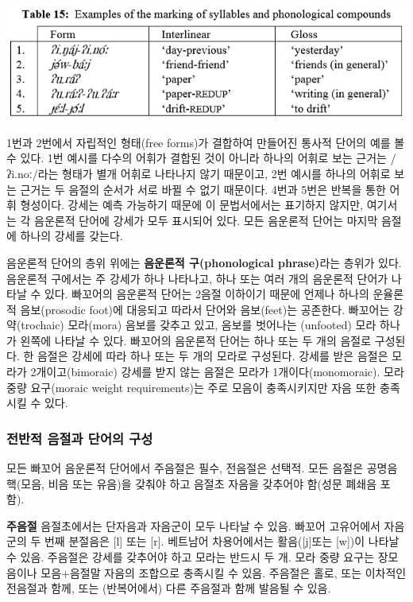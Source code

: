 \includegraphics{Pacoh/src/PacohTable15.png}

1번과 2번에서 자립적인 형태(free forms)가 결합하여 만들어진 통사적 단어의 예를 볼 수 있다.
1번 예시를 다수의 어휘가 결합된 것이 아니라 하나의 어휘로 보는 근거는 /ʔi.noː/라는 형태가 별개 어휘로 나타나지 않기 때문이고, 2번 예시를 하나의 어휘로 보는 근거는 두 음절의 순서가 서로 바뀔 수 없기 때문이다.
4번과 5번은 반복을 통한 어휘 형성이다. 강세는 예측 가능하기 때문에 이 문법서에서는 표기하지 않지만, 여기서는 각 음운론적 단어에 강세가 모두 표시되어 있다. 모든 음운론적 단어는 마지막 음절에 하나의 강세를 갖는다.

음운론적 단어의 층위 위에는 \textbf{음운론적 구(phonological phrase)}라는 층위가 있다. 음운론적 구에서는 주 강세가 하나 나타나고, 하나 또는 여러 개의 음운론적 단어가 나타날 수 있다. 빠꼬어의 음운론적 단어는 2음절 이하이기 때문에 언제나 하나의 운율론적 음보(prosodic foot)에 대응되고 따라서 단어와 음보(feet)는 공존한다. 빠꼬어는 강약(trochaic) 모라(mora) 음보를 갖추고 있고, 음보를 벗어나는 (unfooted) 모라 하나가 왼쪽에 나타날 수 있다.
빠꼬어의 음운론적 단어는 하나 또는 두 개의 음절로 구성된다. 한 음절은 강세에 따라 하나 또는 두 개의 모라로 구성된다. 강세를 받은 음절은 모라가 2개이고(bimoraic) 강세를 받지 않는 음절은 모라가 1개이다(monomoraic). 모라 중량 요구(moraic weight requirements)는 주로 모음이 충족시키지만 자음 또한 충족시킬 수 있다.

\subsubsection{전반적 음절과 단어의 구성}
모든 빠꼬어 음운론적 단어에서 주음절은 필수, 전음절은 선택적. 모든 음절은 공명음 핵(모음, 비음 또는 유음)을 갖춰야 하고 음절초 자음을 갖추어야 함(성문 폐쇄음 포함).

\textbf{주음절} 음절초에서는 단자음과 자음군이 모두 나타날 수 있음. 빠꼬어 고유어에서 자음군의 두 번째 분절음은 [l] 또는 [r]. 베트남어 차용어에서는 활음([j]또는 [w])이 나타날 수 있음. 주음절은 강세를 갖추어야 하고 모라는 반드시 두 개. 모라 중량 요구는 장모음이나 모음+음절말 자음의 조합으로 충족시킬 수 있음. 주음절은 홀로, 또는 이차적인 전음절과 함께, 또는 (반복어에서) 다른 주음절과 함께 발음될 수 있음.

